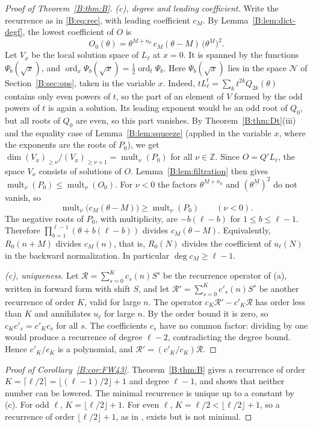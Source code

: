 \documentclass[11pt,a4paper]{article}
\theoremstyle{definition}
\theoremstyle{remark}
\newcommand{\Z}{\mathbb Z}
\newcommand{\fl}[1]{\lfloor #1\rfloor}
\newcommand{\cl}[1]{\lceil #1\rceil}
\newcommand{\ff}[2]{#1^{\underline{#2}}}
\DeclareMathOperator{\ord}{ord}
\numberwithin{equation}{section}
\begin{document}
\begin{proof}[Proof of Theorem~\ref{B:thm:B}]
\emph{(c), degree and leading coefficient.} Write the recurrence as in \eqref{B:eq:rec}, with leading coefficient $c_M$. By Lemma~\ref{B:lem:dict-degf}, the lowest coefficient of $O$ is
\[
O_0(\theta)=\ff{\theta}{M+n_0}\,c_M(\theta-M)\,\bigl(\ff{\theta}{M}\bigr)^2 .
\]
Let $V_x$ be the local solution space of $L_\ell$ at $x=0$. It is spanned by the functions $\Psi_b(\sqrt x)$, and $\ord_x\Psi_b(\sqrt x)=\frac12\ord_t\Psi_b$. Here $\Psi_b(\sqrt x)$ lies in the space $\mathcal N$ of Section~\ref{B:sec:ops}, taken in the variable $x$. Indeed, $tL^t_\ell=\sum_kt^{2k}Q_{2k}(\theta)$ contains only even powers of $t$, so the part of an element of $V$ formed by the odd powers of $t$ is again a solution. Its leading exponent would be an odd root of $Q_0$, but all roots of $Q_0$ are even, so this part vanishes. By Theorem~\ref{B:thm:Dt}(iii) and the equality case of Lemma~\ref{B:lem:squeeze} (applied in the variable $x$, where the exponents are the roots of $P_0$), we get $\dim(V_x)_{\ge\nu}/(V_x)_{\ge\nu+1}=\operatorname{mult}_\nu(P_0)$ for all $\nu\in\Z$. Since $O=Q'L_\ell$, the space $V_x$ consists of solutions of $O$. Lemma~\ref{B:lem:filtration} then gives $\operatorname{mult}_\nu(P_0)\le\operatorname{mult}_\nu(O_0)$. For $\nu<0$ the factors $\ff{\theta}{M+n_0}$ and $(\ff{\theta}{M})^2$ do not vanish, so
\[
\operatorname{mult}_\nu\bigl(c_M(\theta-M)\bigr)\ge\operatorname{mult}_\nu(P_0)\qquad(\nu<0).
\]
The negative roots of $P_0$, with multiplicity, are $-b(\ell-b)$ for $1\le b\le\ell-1$. Therefore $\prod_{b=1}^{\ell-1}(\theta+b(\ell-b))$ divides $c_M(\theta-M)$. Equivalently, $R_0(n+M)$ divides $c_M(n)$, that is, $R_0(N)$ divides the coefficient of $u_\ell(N)$ in the backward normalization. In particular $\deg c_M\ge\ell-1$.

\emph{(c), uniqueness.} Let $\mathcal R=\sum_{s=0}^Kc_s(n)S^s$ be the recurrence operator of (a), written in forward form with shift $S$, and let $\mathcal R'=\sum_{s=0}^Kc'_s(n)S^s$ be another recurrence of order $K$, valid for large $n$. The operator $c_K\mathcal R'-c'_K\mathcal R$ has order less than $K$ and annihilates $u_\ell$ for large $n$. By the order bound it is zero, so $c_Kc'_s=c'_Kc_s$ for all $s$. The coefficients $c_s$ have no common factor: dividing by one would produce a recurrence of degree $\ell-2$, contradicting the degree bound. Hence $c'_K/c_K$ is a polynomial, and $\mathcal R'=(c'_K/c_K)\mathcal R$.
\end{proof}

\begin{proof}[Proof of Corollary~\ref{B:cor:FW43}]
Theorem~\ref{B:thm:B} gives a recurrence of order $K=\cl{\ell/2}=\fl{(\ell-1)/2}+1$ and degree $\ell-1$, and shows that neither number can be lowered. The minimal recurrence is unique up to a constant by (c). For odd $\ell$, $K=\fl{\ell/2}+1$. For even $\ell$, $K=\ell/2<\fl{\ell/2}+1$, so a recurrence of order $\fl{\ell/2}+1$, as in \cite[(4.8)]{FW26}, exists but is not minimal.
\end{proof}
\end{document}
